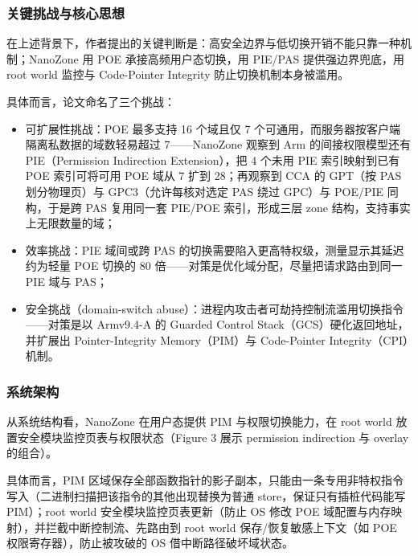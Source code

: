 \documentclass[11pt]{ctexart}
\begin{document}
\subsubsection{关键挑战与核心思想}
在上述背景下，作者提出的关键判断是：高安全边界与低切换开销不能只靠一种机制；NanoZone 用 POE 承接高频用户态切换，用 PIE/PAS 提供强边界兜底，用 root world 监控与 Code-Pointer Integrity 防止切换机制本身被滥用。\par
具体而言，论文命名了三个挑战：
\begin{itemize}
\item 可扩展性挑战：POE 最多支持 16 个域且仅 7 个可通用，而服务器按客户端隔离私数据的域数轻易超过 7——NanoZone 观察到 Arm 的间接权限模型还有 PIE（Permission Indirection Extension），把 4 个未用 PIE 索引映射到已有 POE 索引可将可用 POE 域从 7 扩到 28；再观察到 CCA 的 GPT（按 PAS 划分物理页）与 GPC3（允许每核对选定 PAS 绕过 GPC）与 POE/PIE 同构，于是跨 PAS 复用同一套 PIE/POE 索引，形成三层 zone 结构，支持事实上无限数量的域；
\item 效率挑战：PIE 域间或跨 PAS 的切换需要陷入更高特权级，测量显示其延迟约为轻量 POE 切换的 80 倍——对策是优化域分配，尽量把请求路由到同一 PIE 域与 PAS；
\item 安全挑战（domain-switch abuse）：进程内攻击者可劫持控制流滥用切换指令——对策是以 Armv9.4-A 的 Guarded Control Stack（GCS）硬化返回地址，并扩展出 Pointer-Integrity Memory（PIM）与 Code-Pointer Integrity（CPI）机制。
\end{itemize}
\subsubsection{系统架构}
从系统结构看，NanoZone 在用户态提供 PIM 与权限切换能力，在 root world 放置安全模块监控页表与权限状态（Figure 3 展示 permission indirection 与 overlay 的组合）。\par
具体而言，PIM 区域保存全部函数指针的影子副本，只能由一条专用非特权指令写入（二进制扫描把该指令的其他出现替换为普通 store，保证只有插桩代码能写 PIM）；root world 安全模块监控页表更新（防止 OS 修改 POE 域配置与内存映射），并拦截中断控制流、先路由到 root world 保存/恢复敏感上下文（如 POE 权限寄存器），防止被攻破的 OS 借中断路径破坏域状态。\par
\end{document}
